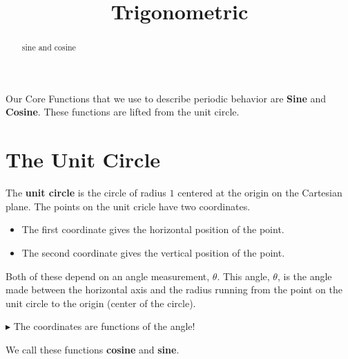 \documentclass{ximera}
\title{Trigonometric}
\begin{document}
\begin{abstract}
sine and cosine
\end{abstract}
\maketitle








Our Core Functions that we use to describe periodic behavior are \textbf{Sine} and \textbf{Cosine}.  These functions are lifted from the unit circle.






\section*{The Unit Circle}


The \textbf{unit circle} is the circle of radius $1$ centered at the origin on the Cartesian plane. The points on the unit cricle have two coordinates.  

\begin{itemize}
\item The first coordinate gives the horizontal position of the point. 
\item The second coordinate gives the vertical position of the point.  
\end{itemize}

Both of these depend on an angle measurement, $\theta$. This angle, $\theta$, is the angle made between the horizontal axis and the radius running from the point on the unit circle to the origin (center of the circle).


\textbf{\textcolor{red!70!darkgray}{$\blacktriangleright$}}  The coordinates are functions of the angle!

We call these functions \textbf{cosine} and \textbf{sine}.
\end{document}
